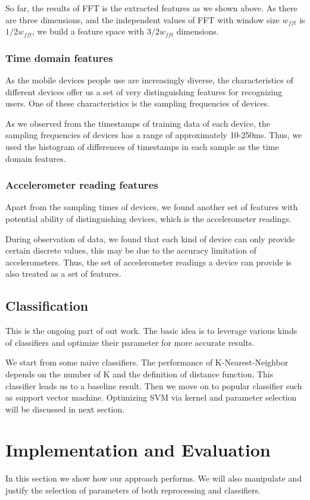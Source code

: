 \documentclass{article} %
\begin{document}
So far, the results of FFT is the extracted features as we shown above. As there are three dimensions, and the independent values of FFT with window size $w_{fft}$ is $1/2w_{fft}$, we build a feature space with $3/2w_{fft}$ dimensions.

\subsubsection{Time domain features}
As the mobile devices people use are increasingly diverse, the characteristics of different devices offer us a set of very distinguishing features for recognizing users. One of these characteristics is the sampling frequencies of devices.

As we observed from the timestamps of training data of each device, the sampling frequencies of devices has a range of approximately 10-250ms. Thus, we used the histogram of differences of timestamps in each sample as the time domain features.

\subsubsection{Accelerometer reading features}
Apart from the sampling times of devices, we found another set of features with potential ability of distinguishing devices, which is the accelerometer readings.

During observation of data, we found that each kind of device can only provide certain discrete values, this may be due to the accuracy limitation of accelerometers. Thus, the set of accelerometer readings a device can provide is also treated as a set of features.

\subsection{Classification}
This is the ongoing part of out work. The basic idea is to leverage various kinds of classifiers and optimize their parameter for more accurate results.

We start from some naive classifiers. The performance of K-Nearest-Neighbor depends on the number of K and the definition of distance function. This classifier leads us to a baseline result. Then we move on to popular classifier such as support vector machine. Optimizing SVM via kernel and parameter selection will be discussed in next section.

\section{Implementation and Evaluation}
In this section we show how our approach performs. We will also manipulate and justify the selection of parameters of both reprocessing and classifiers.
\end{document}
